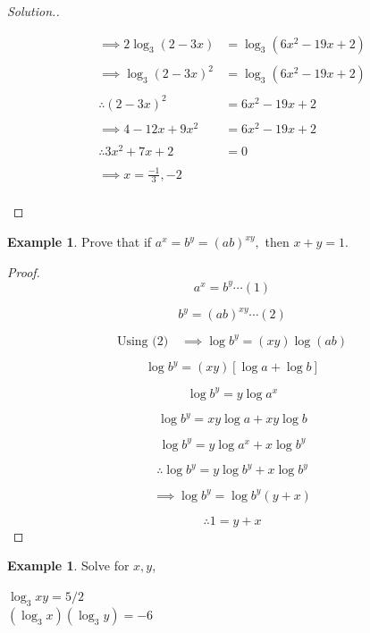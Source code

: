 \documentclass[11pt,a4paper]{article}
\theoremstyle{definition}
\newtheorem{example}[thm]{Example}
\newenvironment{solution}
  {\renewcommand{\qedsymbol}{}\begin{proof}[\textit{Solution}.]}
  {\end{proof}}
\begin{document}
\begin{solution}
\begin{enumerate}
\begin{enumerate}
\begin{align*}
\implies 2\log_3(2-3x) & = \log_3(6x^2-19x+2)\\\\
\implies \log_3(2-3x)^2 & = \log_3(6x^2-19x+2)\\\\
\therefore (2-3x)^2 & = 6x^2-19x+2\\\\
\implies 4-12x+9x^2 & = 6x^2-19x+2\\\\
\therefore 3x^2+7x+2 & = 0\\\\
\implies x=\frac{-1}{3},-2\\
\end{align*}
\end{enumerate}
\end{enumerate}
\end{solution}
\begin{example}

Prove that if $a^x=b^y=(ab)^{xy},$ then $x+y=1$.
\end{example}
\begin{proof}

$$a^x=b^y\cdots (1)$$

$$b^y=(ab)^{xy}\cdots (2)$$

$$\text{Using (2)}\quad  \implies \log b^y=(xy)\log (ab)$$

$$\log b^y=(xy)[\log a + \log b]$$

$$\log b^y = y \log a^x$$

$$\log b^y = xy \log a + xy \log b$$

$$\log b^y = y\log a^x+x\log b^y$$

$$\therefore \log b^y =y\log b^y+x\log b^y$$

$$\implies \log b^y = \log b^y(y+x)$$

$$\therefore 1=y+x$$
\end{proof}
\begin{example}

Solve for $x,y$,

$\log_3xy=5/2$\\

$(\log_3x)(\log_3y) = -6$
\end{example}
\end{document}
